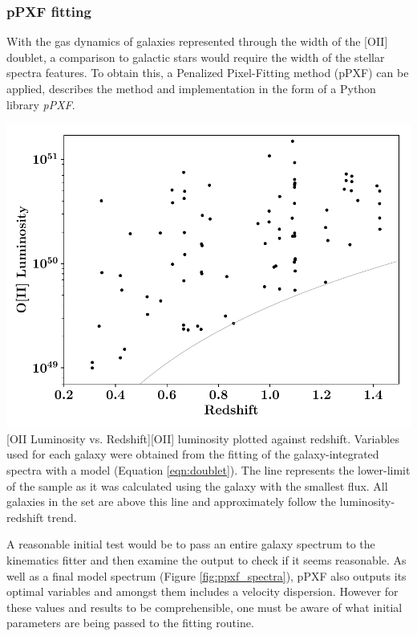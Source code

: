 \documentclass[12pt, twocolumn]{revtex4}    %
\begin{document}
\subsubsection{pPXF fitting}

With the gas dynamics of galaxies represented through the width of the [OII] doublet, a comparison to galactic stars would require the width of the stellar spectra features. To obtain this, a Penalized Pixel-Fitting method (pPXF) can be applied, \cite{cappaellari_ppxf} describes the method and implementation in the form of a Python library \textit{pPXF}.

\begin{center}
\includegraphics[width=1.0\linewidth]{data/o_ii_luminosity_vs_redshift}
[OII Luminosity vs. Redshift]{[OII] luminosity plotted against redshift. Variables used for each galaxy were obtained from the fitting of the galaxy-integrated spectra with a model (Equation \ref{eqn:doublet}). The line represents the lower-limit of the sample as it was calculated using the galaxy with the smallest flux. All galaxies in the set are above this line and approximately follow the luminosity-redshift trend.}
\label{fig:oiiluminosity_redshift}
\end{center} 

A reasonable initial test would be to pass an entire galaxy spectrum to the kinematics fitter and then examine the output to check if it seems reasonable. As well as a final model spectrum (Figure \ref{fig:ppxf_spectra}), pPXF also outputs its optimal variables and amongst them includes a velocity dispersion. However for these values and results to be comprehensible, one must be aware of what initial parameters are being passed to the fitting routine. 
\end{document}
